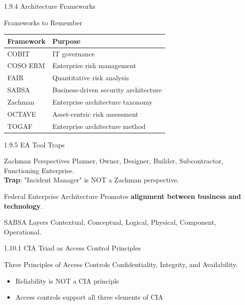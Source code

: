 \documentclass{beamer}
\begin{document}
	\begin{frame}{1.9.4 Architecture Frameworks}
		\begin{block}{Frameworks to Remember}
			\begin{tabular}{|p{3cm}|p{8cm}|}
				\hline
				\textbf{Framework} & \textbf{Purpose} \\
				\hline
				COBIT & IT governance \\
				\hline
				COSO ERM & Enterprise risk management \\
				\hline
				FAIR & Quantitative risk analysis \\
				\hline
				SABSA & Business-driven security architecture \\
				\hline
				Zachman & Enterprise architecture taxonomy \\
				\hline
				OCTAVE & Asset-centric risk assessment \\
				\hline
				TOGAF & Enterprise architecture method \\
				\hline
			\end{tabular}
		\end{block}
	\end{frame}
	
	\begin{frame}{1.9.5 EA Tool Traps}
		\begin{block}{Zachman Perspectives}
			Planner, Owner, Designer, Builder, Subcontractor, Functioning Enterprise. \\
			\textbf{Trap}: "Incident Manager" is NOT a Zachman perspective.
		\end{block}
		\begin{block}{Federal Enterprise Architecture}
			Promotes \textbf{alignment between business and technology}.
		\end{block}
		\begin{block}{SABSA Layers}
			Contextual, Conceptual, Logical, Physical, Component, Operational.
		\end{block}
	\end{frame}
	
	\begin{frame}{1.10.1 CIA Triad as Access Control Principles}
		\begin{block}{Three Principles of Access Controls}
			Confidentiality, Integrity, and Availability.
		\end{block}
		\begin{itemize}
			\item Reliability is NOT a CIA principle
			\item Access controls support all three elements of CIA
		\end{itemize}
	\end{frame}
	
\end{document}
